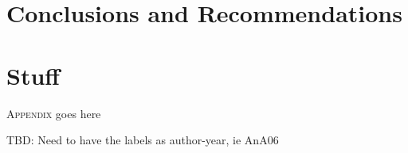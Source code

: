 \documentclass[]{afit-etd}
\newcommand{\tbd}[1]{{\color{red} TBD: #1}}
\begin{document}
\chapter{Conclusions and Recommendations}


%
%
\appendix    %

\chapter{Stuff}
\lettrine{A}{ppendix} goes here


\tbd{Need to have the labels as author-year, ie AnA06}
\end{document}
